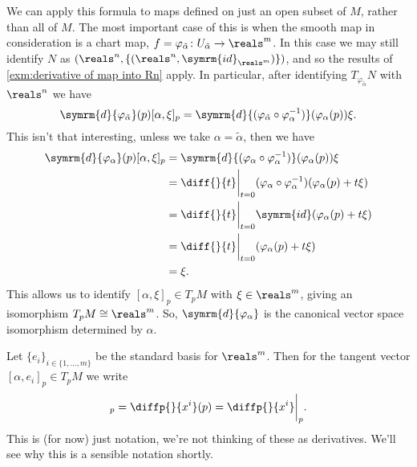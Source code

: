\documentclass[fleqn]{NotesClass}
\renewcommand{\dl}{\symrm{d}}
\newcommand{\id}{\symrm{id}}
\newcommand{\isomorphic}{\cong}
\begin{document}
    \begin{exm}{}{}
        We can apply this formula to maps defined on just an open subset of \(M\), rather than all of \(M\).
        The most important case of this is when the smooth map in consideration is a chart map, \(f = \varphi_{\tilde{\alpha}} \colon U_{\tilde{\alpha}} \to \reals^m\).
        In this case we may still identify \(N\) as \((\reals^n, \{(\reals^n, \id_{\reals^m})\})\), and so the results of \cref{exm:derivative of map into Rn} apply.
        In particular, after identifying \(T_{\varphi_{\tilde{\alpha}}}N\) with \(\reals^n\) we have
        \begin{equation}
            \dl{\varphi_{\tilde{\alpha}}}(p)[\alpha, \xi]_p = \dl{(\varphi_{\tilde{\alpha}} \circ \varphi_\alpha^{-1})}(\varphi_\alpha(p))\xi.
        \end{equation}
        This isn't that interesting, unless we take \(\alpha = \tilde{\alpha}\), then we have
        \begin{align}
            \dl{\varphi_\alpha}(p)[\alpha, \xi]_p &= \dl{(\varphi_\alpha\circ \varphi_\alpha^{-1})}(\varphi_\alpha(p))\xi\\
            &= \diff{}{t}\bigg|_{t=0} (\varphi_\alpha \circ \varphi_\alpha^{-1})(\varphi_\alpha(p) + t\xi)\\
            &= \diff{}{t}\bigg|_{t=0} \id(\varphi_\alpha(p) + t\xi)\\
            &= \diff{}{t}\bigg|_{t=0} (\varphi_\alpha(p) + t\xi)\\
            &= \xi.
        \end{align}
        This allows us to identify \([\alpha, \xi]_p \in T_pM\) with \(\xi \in \reals^m\), giving an isomorphism \(T_pM \isomorphic \reals^m\).
        So, \(\dl{\varphi_\alpha}\) is the canonical vector space isomorphism determined by \(\alpha\).
    \end{exm}
    
    \begin{ntn}{}{}
        Let \(\{e_i\}_{i \in \{1, \dotsc, m\}}\) be the standard basis for \(\reals^m\).
        Then for the tangent vector \([\alpha, e_i]_p \in T_pM\) we write
        \begin{equation}
            [\alpha, e_i]_p = \diffp{}{x^i}(p) = \diffp{}{x^i}\bigg|_p.
        \end{equation}
        This is (for now) just notation, we're not thinking of these as derivatives.
        We'll see why this is a sensible notation shortly.
    \end{ntn}
    
\end{document}
